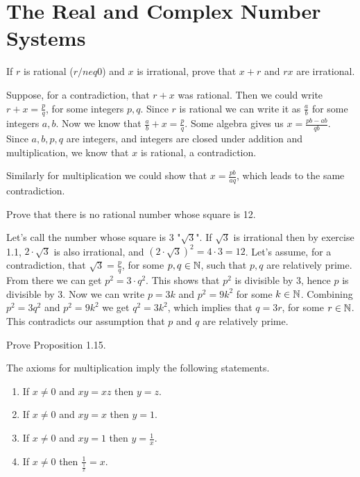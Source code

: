 \section{The Real and Complex Number Systems}


\begin{problem}
If $r$ is rational ($r /neq 0$) and $x$ is irrational, prove that $x + r$ and $rx$ are irrational.
\end{problem}

\begin{solution}
Suppose, for a contradiction, that $r + x$ was rational.
Then we could write $r + x = \frac{p}{q}$, for some integers $p,q$.
Since $r$ is rational we can write it as $\frac{a}{b}$ for some integers $a,b$.
Now we know that $\frac{a}{b} + x = \frac{p}{q}$.
Some algebra gives us $x=\frac{pb-ab}{qb}$.
Since $a,b,p,q$ are integers, and integers are closed under addition and multiplication, we know that $x$ is rational, a contradiction.

Similarly for multiplication we could show that $x=\frac{pb}{aq}$, which leads to the same contradiction.
\end{solution}

\begin{problem}
Prove that there is no rational number whose square is 12.
\end{problem}

\begin{solution}
Let's call the number whose square is $3$ "$\sqrt{3}$".
If $\sqrt{3}$ is irrational then by exercise 1.1, $2 \cdot \sqrt{3}$ is also irrational, and $(2 \cdot \sqrt{3})^2 = 4 \cdot 3 = 12$.
Let's assume, for a contradiction, that $\sqrt{3} = \frac{p}{q}$, for some $p,q \in \mathbb{N}$, such that $p,q$ are relatively prime.
From there we can get $p^2 = 3 \cdot q^2$. This shows that $p^2$ is divisible by $3$, hence $p$ is divisible by 3. Now we can write $p = 3k$ and $p^2 = 9k^2$ for some $k \in \mathbb{N}$.
Combining $p^2 = 3q^2$ and $p^2 = 9k^2$ we get $q^2 = 3k^2$, which implies that $q = 3r$, for some $r \in \mathbb{N}$.
This contradicts our assumption that $p$ and $q$ are relatively prime.
\end{solution}

\begin{problem}
Prove Proposition 1.15.

The axioms for multiplication imply the following statements.
\begin{enumerate}[label=(\alph*)]
\item If $x \neq 0$ and $xy = xz$ then $y = z$.
\item If $x \neq 0$ and $xy = x$ then $y = 1$.
\item If $x \neq 0$ and $xy = 1$ then $y = \frac{1}{x}$.
\item If $x \neq 0$ then $\frac{1}{\frac{1}{x}} = x$.
\end{enumerate}
\end{problem}

